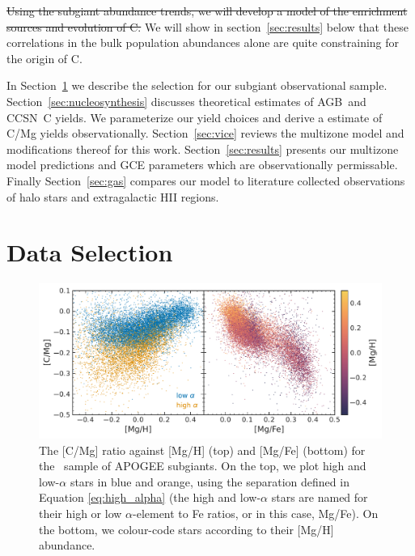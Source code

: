 \documentclass[fleqn,
usenatbib]{mnras}
\newcommand{\citetjack}{\citet{jack}}
\newcommand{\agb}{AGB}
\newcommand{\apogee}{APOGEE}
\newcommand{\cc}{CCSN}
\newcommand{\strike}[1]{{\color{ForestGreen} \sout{#1}}}
\newcommand{\add}[1]{{\color{ForestGreen} #1}}
\begin{document}
\strike{Using the subgiant abundance trends, we will develop a model of the enrichment sources and evolution of C.}
\add{We will show in section~\ref{sec:results} below that these correlations in the bulk population abundances alone are quite constraining for the origin of C.}



In Section~\ref{sec:data_selection} we describe the selection for our subgiant observational sample.
Section~\ref{sec:nucleosynthesis} discusses theoretical estimates of \agb\ and \cc\ C yields. We parameterize our yield choices and derive a estimate of C/Mg yields observationally.
Section~\ref{sec:vice} reviews the multizone model and modifications thereof for this work.
Section~\ref{sec:results} presents our multizone model predictions and GCE parameters which are observationally permissable. 
Finally Section~\ref{sec:gas} compares our model to literature collected observations of halo stars and extragalactic HII regions. 





\section{Data Selection}\label{sec:data_selection}


\begin{figure}
    \centering
    \includegraphics{subgiants.pdf}
    \caption{The [C/Mg] ratio against [Mg/H] (top) and [Mg/Fe] (bottom) for the \citetjack~sample of \apogee{} subgiants. On the top, we plot high and low-$\alpha$ stars in blue and orange, using the separation defined in Equation \ref{eq:high_alpha} (the high and low-$\alpha$ stars are named for their high or low $\alpha$-element to Fe ratios, or in this case, Mg/Fe). On the bottom, we colour-code stars according to their [Mg/H] abundance.} \label{fig:subgiants}
\end{figure}
\end{document}
